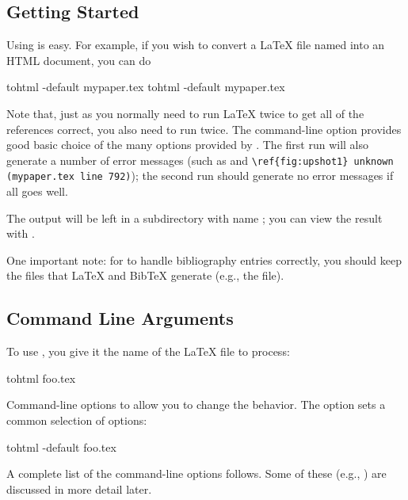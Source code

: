 \documentclass[twoside]{doctext/linfoem}
\begin{document}
\subsection{Getting Started}
Using  is easy.  For example, if you wish to convert a LaTeX file
named  into an HTML document, you can do
\begin{example}
tohtml -default mypaper.tex
tohtml -default mypaper.tex
\end{example}
Note that, just as you normally need to run LaTeX twice to get all of the
references correct, you also need to run  twice.  The
command-line option  provides good basic choice of the many
options provided by .  The first run will also generate a number
of error messages (such as  and 
\verb+\ref{fig:upshot1} unknown (mypaper.tex line 792)+); the second run
should generate no error messages if all goes well.

The output will be left in a subdirectory with name ; you can
view the result with .

One important note:  for  to handle bibliography entries
correctly, you should keep the files that LaTeX and BibTeX generate 
(e.g., the  file).  

\subsection{Command Line Arguments}
To use , you give it the name of the LaTeX
file to process:
\begin{example}
tohtml foo.tex
\end{example}
Command-line options to  allow you to change the behavior.  The
option  sets a common selection of options:
\begin{example}
tohtml -default foo.tex
\end{example}

A complete list of the command-line options follows.  Some of these (e.g.,
) are discussed in more detail later.
\end{document}
